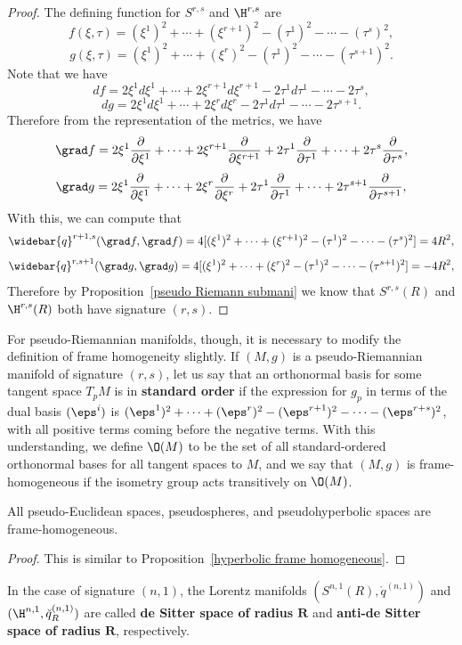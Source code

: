 \begin{proof}
The defining function for $S^{r,s}$ and $\H^{r,s}$ are
\[f(\xi,\tau)=(\xi^1)^2+\cdots+(\xi^{r+1})^2-(\tau^1)^2-\cdots-(\tau^s)^2,\]
\[g(\xi,\tau)=(\xi^1)^2+\cdots+(\xi^{r})^2-(\tau^1)^2-\cdots-(\tau^{s+1})^2.\]
Note that we have 
\[df=2\xi^1d\xi^1+\cdots+2\xi^{r+1}d\xi^{r+1}-2\tau^1d\tau^1-\cdots-2\tau^s,\]
\[dg=2\xi^1d\xi^1+\cdots+2\xi^{r}d\xi^r-2\tau^1d\tau^1-\cdots-2\tau^{s+1}.\]
Therefore from the representation of the metrics, we have
\[\grad f=2\xi^1\frac{\partial}{\partial \xi^1}+\cdots+2\xi^{r+1}\frac{\partial}{\partial \xi^{r+1}}+2\tau^1\frac{\partial}{\partial \tau^1}+\cdots+2\tau^s\frac{\partial}{\partial\tau^s},\]
\[\grad g=2\xi^1\frac{\partial}{\partial \xi^1}+\cdots+2\xi^r\frac{\partial}{\partial \xi^r}+2\tau^1\frac{\partial}{\partial \tau^1}+\cdots+2\tau^{s+1}\frac{\partial}{\partial\tau^{s+1}},\]
With this, we can compute that 
\[\widebar{q}^{r+1,s}(\grad f,\grad f)=4[(\xi^1)^2+\cdots+(\xi^{r+1})^2-(\tau^1)^2-\cdots-(\tau^s)^2]=4R^2,\]
\[\widebar{q}^{r,s+1}(\grad g,\grad g)=4[(\xi^1)^2+\cdots+(\xi^{r})^2-(\tau^1)^2-\cdots-(\tau^{s+1})^2]=-4R^2,\]
Therefore by Proposition~\ref{pseudo Riemann submani} we know that $S^{r,s}(R)$ and $\H^{r,s}(R)$ both have signature $(r,s)$.
\end{proof}
For pseudo-Riemannian manifolds, though, it is necessary to modify the definition of frame 
homogeneity slightly. If $(M,g)$ is a pseudo-Riemannian manifold of signature $(r,s)$, let us 
say that an orthonormal basis for some tangent space $T_pM$ is in \textbf{standard order} if the 
expression for $g_p$ in terms of the dual basis $(\eps^i)$ is $(\eps^1)^2+\cdots+(\eps^r)^2-(\eps^{r+1})^2-\cdots-(\eps^{r+s})^2$, 
with all positive terms coming before the negative terms. With this understanding, we define 
$\O(M)$ to be the set of all standard-ordered orthonormal bases for all tangent spaces to $M$, 
and we say that $(M,g)$ is frame-homogeneous if the isometry group acts transitively on $\O(M)$.
\begin{proposition}
All pseudo-Euclidean spaces, pseudospheres, and pseudohyperbolic spaces are frame-homogeneous.
\end{proposition}
\begin{proof}
This is similar to Proposition~\ref{hyperbolic frame homogeneous}.
\end{proof}
In the case of signature $(n,1)$, the Lorentz manifolds $(S^{n,1}(R),\mathring{q}^{(n,1)})$
and $(\H^{n,1},\breve{q}^{(n,1)}_R)$ are called \textbf{de Sitter space of radius $\bm{R}$} 
and \textbf{anti-de Sitter space of radius $\bm{R}$}, respectively.
